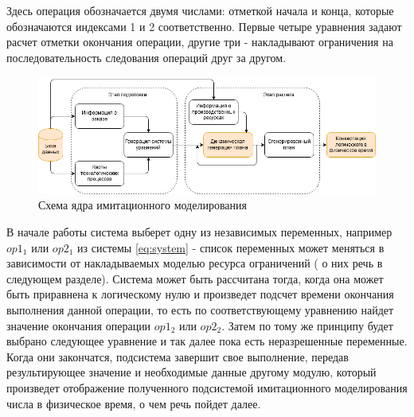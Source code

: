 \indent Здесь операция обозначается двумя числами: отметкой начала и конца, которые обозначаются индексами 1 и 2 соответственно.
Первые четыре уравнения задают расчет отметки окончания операции, другие три - накладывают ограничения на последовательность следования операций друг за другом.

\begin{figure}[ht]
	\centering
	\includegraphics[width=\linewidth]{pics/imcoreDataflow.png}
	\caption{Схема ядра имитационного моделирования}
	\label{fig:imcoreFlow}
\end{figure}

\indent В начале работы система выберет одну из независимых переменных, например $op1_1$ или $op2_1$ из системы \ref{eq:system} - список переменных может меняться в зависимости от накладываемых моделью ресурса ограничений ( о них речь в следующем разделе).
Система может быть рассчитана тогда, когда она может быть приравнена к логическому нулю и произведет подсчет времени окончания выполнения данной операции, то есть по соответствующему уравнению найдет значение окончания операции $op1_2$ или $op2_2$.
Затем по тому же принципу будет выбрано следующее уравнение и так далее пока есть неразрешенные переменные.
Когда они закончатся, подсистема завершит свое выполнение, передав результирующее значение и необходимые данные другому модулю, который произведет отображение полученного подсистемой имитационного моделирования числа в физическое время, о чем речь пойдет далее.